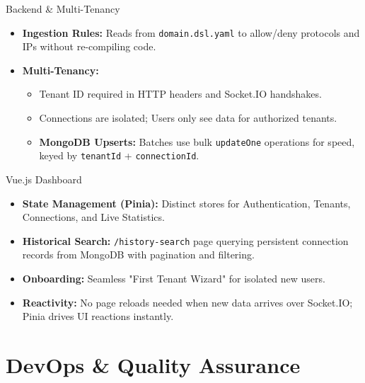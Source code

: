 \documentclass[aspectratio=169]{beamer}
\begin{document}
\begin{frame}{Backend \& Multi-Tenancy}
    \begin{itemize}
        \item \textbf{Ingestion Rules:} Reads from \texttt{domain.dsl.yaml} to allow/deny protocols and IPs without re-compiling code.
        \item \textbf{Multi-Tenancy:} 
        \begin{itemize}
            \item Tenant ID required in HTTP headers and Socket.IO handshakes.
            \item Connections are isolated; Users only see data for authorized tenants.
        \item \textbf{MongoDB Upserts:} Batches use bulk \texttt{updateOne} operations for speed, keyed by \texttt{tenantId} + \texttt{connectionId}.
        \end{itemize}
    \end{itemize}
\end{frame}

\begin{frame}{Vue.js Dashboard}
    \begin{itemize}
        \item \textbf{State Management (Pinia):} Distinct stores for Authentication, Tenants, Connections, and Live Statistics.
        \item \textbf{Historical Search:} \texttt{/history-search} page querying persistent connection records from MongoDB with pagination and filtering.
        \item \textbf{Onboarding:} Seamless "First Tenant Wizard" for isolated new users.
        \item \textbf{Reactivity:} No page reloads needed when new data arrives over Socket.IO; Pinia drives UI reactions instantly.
    \end{itemize}
\end{frame}

\section{DevOps \& Quality Assurance}
\end{document}
